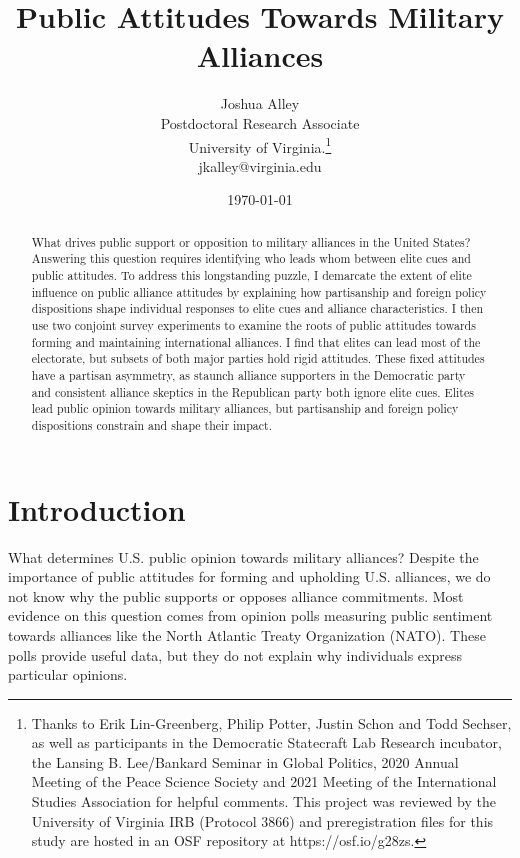 \documentclass[12pt]{article}
\title{\textbf{Public Attitudes Towards Military Alliances}}
\author{Joshua Alley \\
Postdoctoral Research Associate \\
University of Virginia.\thanks{Thanks to Erik Lin-Greenberg, Philip Potter, Justin Schon and Todd Sechser, as well as participants in the Democratic Statecraft Lab Research incubator, the Lansing B. Lee/Bankard Seminar in Global Politics, 2020 Annual Meeting of the Peace Science Society and 2021 Meeting of the International Studies Association for helpful comments. This project was reviewed by the University of Virginia IRB (Protocol 3866) and preregistration files for this study are hosted in an OSF repository at https://osf.io/g28zs.} \\
jkalley@virginia.edu
}
\date{\today}
\begin{document}
\maketitle 

\doublespace 

\begin{abstract}
What drives public support or opposition to military alliances in the United States? 
Answering this question requires identifying who leads whom between elite cues and public attitudes.  
To address this longstanding puzzle, I demarcate the extent of elite influence on public alliance attitudes by explaining how partisanship and foreign policy dispositions shape individual responses to elite cues and alliance characteristics. 
I then use two conjoint survey experiments to examine the roots of public attitudes towards forming and maintaining international alliances.  
I find that elites can lead most of the electorate, but subsets of both major parties hold rigid attitudes. 
These fixed attitudes have a partisan asymmetry, as staunch alliance supporters in the Democratic party and consistent alliance skeptics in the Republican party both ignore elite cues.  
Elites lead public opinion towards military alliances, but partisanship and foreign policy dispositions constrain and shape their impact.  
\end{abstract}


\newpage 


\section{Introduction}

What determines U.S. public opinion towards military alliances? 
Despite the importance of public attitudes for forming and upholding U.S. alliances, we do not know why the public supports or opposes alliance commitments. 
Most evidence on this question comes from opinion polls measuring public sentiment towards alliances like the North Atlantic Treaty Organization (NATO).
These polls provide useful data, but they do not explain why individuals express particular opinions. 
\end{document}

